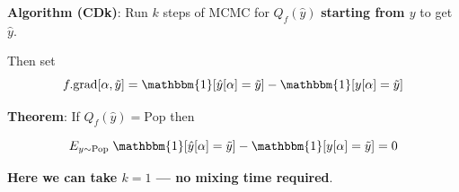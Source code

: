 {  
{\bf Algorithm (CDk)}: Run $k$ steps of MCMC for $Q_f(\hat{y})$ {\bf starting from $y$} to get $\hat{y}$.

\vfill
Then set
$$f.\mathrm{grad}[\alpha,\tilde{y}] = \mathbbm{1}[\hat{y}[\alpha] = \tilde{y}] - \mathbbm{1}[y[\alpha]= \tilde{y}]$$

\vfill
    {\bf Theorem}: If $Q_f(\hat{y}) = \mathrm{Pop}$ then
    
    $$E_{y \sim \mathrm{Pop}}\; \mathbbm{1}[\hat{y}[\alpha] = \tilde{y}] - \mathbbm{1}[y[\alpha]= \tilde{y}] = 0$$

\vfill
{\bf Here we can take $k=1$ --- \bf no mixing time required}.



}


